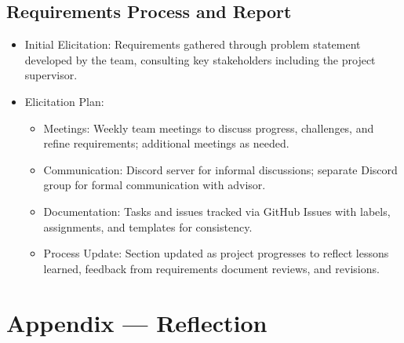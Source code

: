 \documentclass{article}
\begin{document}
\subsection{Requirements Process and Report}\label{subsec:reqprocess}
\begin{itemize}
    \item {Initial Elicitation}: Requirements gathered through problem statement developed by the team, consulting key stakeholders including the project supervisor.
    \item {Elicitation Plan}:
    \begin{itemize}
        \item Meetings: Weekly team meetings to discuss progress, challenges, and refine requirements; additional meetings as needed.
        \item Communication: Discord server for informal discussions; separate Discord group for formal communication with advisor.
        \item Documentation: Tasks and issues tracked via GitHub Issues with labels, assignments, and templates for consistency.
        \item Process Update: Section updated as project progresses to reflect lessons learned, feedback from requirements document reviews, and revisions.
    \end{itemize}
\end{itemize}

\newpage{}

\section*{Appendix --- Reflection}

\end{document}
